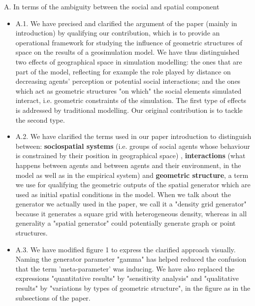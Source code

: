 \documentclass[11pt,a4paper,sans]{moderncv}        %
\begin{document}
 \medskip
A. In terms of the ambiguity between the social and spatial component 
\begin{itemize}
\item A.1. We have precised and clarified the argument of the paper (mainly in introduction) by qualifying our contribution, which is to provide an operational framework for studying the influence of geometric structures of space on the results of a geosimulation model. We have thus distinguished two effects of geographical space in simulation modelling: the ones that are part of the model, reflecting for example the role played by distance on decreasing agents' perception or potential social interactions; and the ones which act as geometric structures "on which" the social elements simulated interact, i.e. geometric constraints of the simulation. The first type of effects is addressed by traditional modelling. Our original contribution is to tackle the second type. %
 
\item A.2. We have clarified the terms used in our paper introduction to distinguish between: \textbf{sociospatial systems} (i.e. groups of social agents whose behaviour is constrained by their position in geographical space)%
, \textbf{interactions} (what happens between agents and between agents and their environment, in the model as well as in the empirical system) and \textbf{geometric structure}, a term we use for qualifying the geometric outputs of the spatial generator which are used as initial spatial conditions in the model. When we talk about the generator we actually used in the paper, we call it a "density grid generator" because it generates a square grid with heterogeneous density, whereas in all generality a "spatial generator" could potentially generate graph or point structures. %

 \item A.3. We have modified figure 1 to express the clarified approach visually. Naming the generator parameter "gamma" has helped reduced the confusion that the term 'meta-parameter' was inducing. We have also replaced the expressions "quantitative results" by "sensitivity analysis" and "qualitative results" by "variations by types of geometric structure", in the figure as in the subsections of the paper.
\end{itemize}
\end{document}

